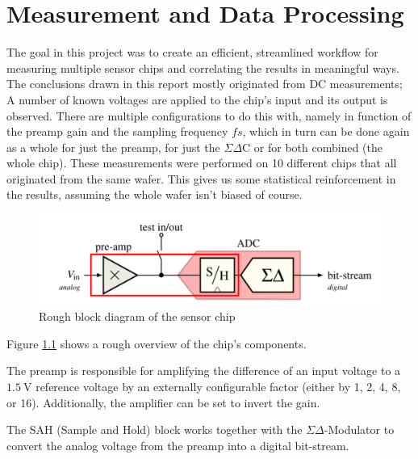 \chapter{Measurement and Data Processing}
\label{chap:measurementProcess}


The goal in this project was to  create an efficient, streamlined workflow for
measuring multiple sensor chips  and  correlating  the  results  in meaningful
ways.  The  conclusions  drawn  in  this  report  mostly  originated  from  DC
measurements;  A  number of known voltages are applied to the chip's input and
its output is observed. There are multiple  configurations  to  do  this with,
namely  in  function of the preamp gain and the sampling frequency $fs$, which
in  turn  can  be  done  again as a whole for just the preamp,  for  just  the
$\Sigma\Delta$C or for both combined (the whole chip). These measurements were
performed on 10 different chips that all originated from the same wafer.  This
gives us some statistical reinforcement in  the  results,  assuming  the whole
wafer isn't biased of course.

\begin{figure}[t]
    \centering
    \includegraphics[width=.8\linewidth]{images/blockdiagram.png}
    \caption{Rough block diagram of the sensor chip}
    \label{fig:blockdiagram}
\end{figure}

Figure \ref{fig:blockdiagram} shows a rough overview of the chip's components.

The preamp is responsible for amplifying the difference of an input voltage to
a  $\SI{1.5}{\volt}$ reference voltage by an  externally  configurable  factor
(either  by  1,  2,  4,  8,  or 16). Additionally, the amplifier can be set to
invert the gain.

The   SAH   (Sample   and    Hold)    block    works    together    with   the
$\Sigma\Delta$-Modulator  to convert the analog voltage from the preamp into a
digital bit-stream.

